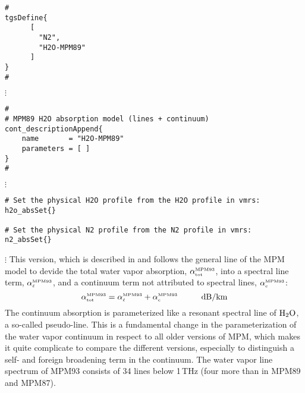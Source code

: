 
\begin{verbatim}
#
tgsDefine{
      [ 
        "N2",
        "H2O-MPM89"
      ] 
}
#
\end{verbatim}
$\vdots$
\begin{verbatim}
#
# MPM89 H2O absorption model (lines + continuum)
cont_descriptionAppend{
    name       = "H2O-MPM89"
    parameters = [ ]
}
#
\end{verbatim}
$\vdots$
\begin{verbatim}
# Set the physical H2O profile from the H2O profile in vmrs:
h2o_absSet{}

# Set the physical N2 profile from the N2 profile in vmrs:
n2_absSet{}
\end{verbatim}
$\vdots$
%
%
%
% 
\label{leveld:mpm93}
This version, which is described in \cite{liebeandlayton:87} and 
follows the general line of the MPM model to devide the total 
water vapor absorption, $\alpha^{\mbox{\rm \tiny MPM93}}_{\mbox{\tiny tot}}$, into a spectral line 
term, $\alpha^{\mbox{\rm \tiny MPM93}}_{\mbox{\tiny $\ell$}}$, and a continuum term not attributed to 
spectral lines, $\alpha^{\mbox{\rm \tiny MPM93}}_{\mbox{\tiny c}}$:
\begin{equation}
  \label{eq:mpm93_abs}
  \alphampmntot = \alphampmnl + \alphampmnc\hspace*{10mm}\mbox{dB/km}
\end{equation}
The continuum absorption is parameterized like a
resonant spectral line of $\mbox{H}_2\mbox{O}$, a so-called pseudo-line. This is a 
fundamental change in the parameterization of the water vapor
continuum in respect to all older versions of MPM, which makes it 
quite complicate to compare the different versions, especially to 
distinguish a self- and foreign broadening term in the continuum.
%
%
\label{levele:h2o_mpm87_lines}
The water vapor line spectrum of MPM93 \cite{liebeetal:93} 
consists of 34 lines below 1\,THz (four more than in MPM89 and MPM87). 


